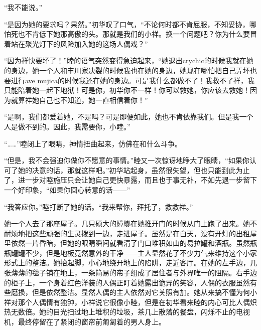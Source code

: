 \documentclass{article}
\begin{document}
“我不能说。”



“是因为她的要求吗？果然。”初华叹了口气，“不论何时都不肯屈服，不知妥协，哪怕死也不肯低下她那高傲的头。那就是我们的小祥。换一个问题吧？你为什么要冒着站在聚光灯下的风险加入她的这场人偶戏？”



“因为祥快要坏了！”睦的语气突然变得急迫起来，“她退出crychic的时候我就在她的身边，她一个人和丰川家决裂的时候我也在她的身边，她现在哪怕把自己弄坏也要进行ave mujica的时候我还在她的身边。可是我什么都做不了！我救不了祥，我只能陪着她一起下地狱！可是你，初华你不一样！你可以救她，你应该去救她！因为就算祥她自己也不知道，她一直相信着你！”



“是啊，我们都爱着她，不是吗？可是即便如此，她也不肯依靠我们。但是我一个人是做不到的。因此，我需要你，小睦。”



“……”睦闭上了眼睛，神情扭曲起来，仿佛在和什么斗争。



“但是，我不会强迫你做你不愿意的事情。”睦又一次惊讶地睁大了眼睛，“如果你认可了她的决意的话，那就这样吧。”初华站起身，虽然很失望，但也只能到此为止了，进一步对睦施压只会让她自己更快暴露，而且也于事无补，不如先退一步留下一个好印象，“如果你回心转意的话——”



“我答应你。”睦打断了她的话。“我来帮你，拜托了，救救祥。”



\newpage



她一个人去了那座屋子。几只硕大的蟑螂在她推开门的时候从门上跑了出来。她不耐烦地把这些顽强的生灵拨到一边，走进屋子。虽然是在白天，没有开灯的出租屋里依然一片昏暗，但她的眼睛瞬间就看清了门口堆积如山的易拉罐和酒瓶。虽然瓶瓶罐罐不少，但是地板竟然意外的干净——主人显然花了不少力气来维持这个小家形式上的整洁。她抬起脚，小心地绕开地上的陷阱，走近客厅。在她的左手边，几张薄薄的毯子铺在地上，一条简易的帘子组成了居住者与外界唯一的阻隔。右手边的柜子上，一个身着红色洋装的人偶正盯着她露出诡异的笑容，人偶的衣服虽然有些磨损，但是依然整洁。显然人偶的主人依然对它关照有加。她从来搞不懂为何小祥对那个人偶情有独钟，小祥说它很像小睦，但是在初华看来睦的内心可比人偶炽热无数倍。她的目光扫过地上堆积的垃圾，茶几上散落的餐盘，闪烁不止的电视机，最终停留在了紧闭的窗帘前匍匐着的男人身上。
\end{document}
